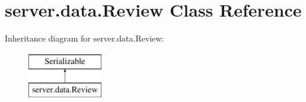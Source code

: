 \hypertarget{classserver_1_1data_1_1_review}{}\section{server.\+data.\+Review Class Reference}
\label{classserver_1_1data_1_1_review}
Inheritance diagram for server.\+data.\+Review\+:\begin{figure}[H]
\begin{center}
\leavevmode
\includegraphics[height=2.000000cm]{classserver_1_1data_1_1_review}
\end{center}
\end{figure}
